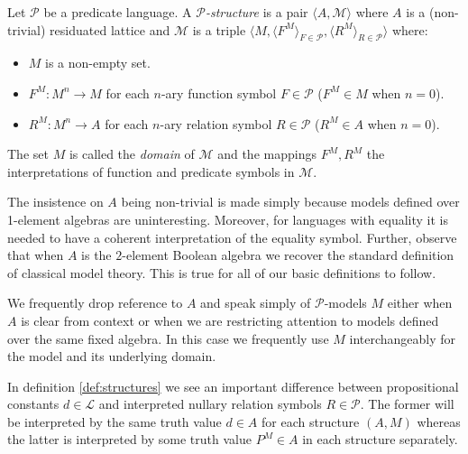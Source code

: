 \documentclass{lmcs} %
\newcommand{\?}{\ensuremath{\mkern0.4\thinmuskip}}
\newcommand{\CM}{\mathcal{M}}
\newcommand{\CL}{\mathcal{L}}
\newcommand{\CP}{\mathcal{P}}
\begin{document}
\begin{defi}\label{def:structures}
    Let $\CP$ be a predicate language. A $\CP$\textit{-structure} is a pair $\langle A,\CM\rangle$ where $A$ is a (non-trivial) residuated lattice and $\CM$ is a triple $\langle M,\langle F^M\rangle_{F\in\CP},\langle R^M\rangle_{R\in\CP}\rangle$ where:\begin{itemize}
        \item $M$ is a non-empty set.
        \item $F^M\colon M^n\rightarrow M$ for each $n$-ary function symbol $F\in\CP$ ($F^M\in M$ when $n=0$). 
        \item $R^M\colon M^n\rightarrow A$ for each $n$-ary relation symbol $R\in\CP$ ($R^M\in A$ when $n=0$).
    \end{itemize} 
    The set $M$ is called the \textit{domain} of $\CM$ and the mappings $F^M,R^M$ the interpretations of function and predicate symbols in $\CM$.
\end{defi}
\begin{rem}
    The insistence on $A$ being non-trivial is made simply because models defined over 1-element algebras are uninteresting. Moreover, for languages with equality it is needed to have a coherent interpretation of the equality symbol. Further, observe that when $A$ is the $2$-element Boolean algebra we recover the standard definition of classical model theory. This is true for all of our basic definitions to follow. 
    
    We frequently drop reference to $A$ and speak simply of $\CP$-models $M$ either when $A$ is clear from context or when we are restricting attention to models defined over the same fixed algebra. In this case we frequently use $M$ interchangeably for the model and its underlying domain. 

    In definition \ref{def:structures} we see an important difference between propositional constants $d\in\CL$ and interpreted nullary relation symbols $R\in\CP$. The former will be interpreted by the same truth value $d\in A$ for each structure $(A,M)$ whereas the latter is interpreted by some truth value $P^M\in A$ in each structure separately.
\end{rem}
 
\end{document}
